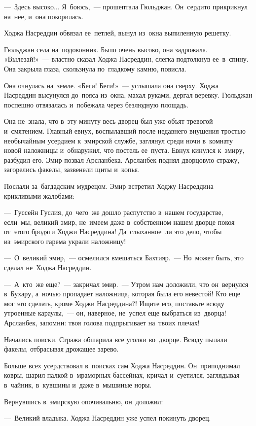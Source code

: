 \documentclass[12pt,a4paper]{book}
\begin{document}
—~Здесь высоко... Я~боюсь,~— прошептала Гюльджан. Он~сердито прикрикнул на~нее, и~она покорилась.

Ходжа Насреддин обвязал ее~петлей, вынул из~окна выпиленную решетку.

Гюльджан села на~подоконник. Было очень высоко, она задрожала. «Вылезай!»~— властно сказал Ходжа Насреддин, слегка подтолкнув ее~в~спину. Она закрыла глаза, скользнула по~гладкому камню, повисла.

Она очнулась на~земле. «Беги! Беги!»~— услышала она сверху. Ходжа Насреддин высунулся до~пояса из~окна, махал руками, дергал веревку. Гюльджан поспешно отвязалась и~побежала через безлюдную площадь.

Она не~знала, что в~эту минуту весь дворец был уже объят тревогой и~смятением. Главный евнух, воспылавший после недавнего внушения тростью необычайным усердием к~эмирской службе, заглянул среди ночи в~комнату новой наложницы и~обнаружил, что постель ее~пуста. Евнух кинулся к~эмиру, разбудил его. Эмир позвал Арсланбека. Арсланбек поднял дворцовую стражу, загорелись факелы, зазвенели щиты и~копья.

Послали за~багдадским мудрецом. Эмир встретил Ходжу Насреддина крикливыми жалобами:

—~Гуссейн Гуслия, до~чего~же дошло распутство в~нашем государстве, если~мы, великий эмир, не~имеем даже в~собственном нашем дворце покоя от~этого бродяги Ходжи Насреддина! Да~слыханное~ли это дело, чтобы из~эмирского гарема украли наложницу!

—~О~великий эмир,~— осмелился вмешаться Бахтияр.~— Но~может быть, это сделал не~Ходжа Насреддин.

—~А~кто~же еще?~— закричал эмир.~— Утром нам доложили, что он~вернулся в~Бухару, а~ночью пропадает наложница, которая была его невестой! Кто еще мог это сделать, кроме Ходжи Насреддина?! Ищите его, поставьте всюду утроенные караулы,~— он, наверное, не~успел еще выбраться из~дворца! Арсланбек, запомни: твоя голова подпрыгивает на~твоих плечах!

Начались поиски. Стража обшарила все уголки во~дворце. Всюду пылали факелы, отбрасывая дрожащее зарево.

Больше всех усердствовал в~поисках сам Ходжа Насреддин. Он~приподнимал ковры, шарил палкой в~мраморных бассейнах, кричал и~суетился, заглядывая в~чайник, в~кувшины и~даже в~мышиные норы.

Вернувшись в~эмирскую опочивальню, он~доложил:

—~Великий владыка. Ходжа Насреддин уже успел покинуть дворец.
\end{document}
